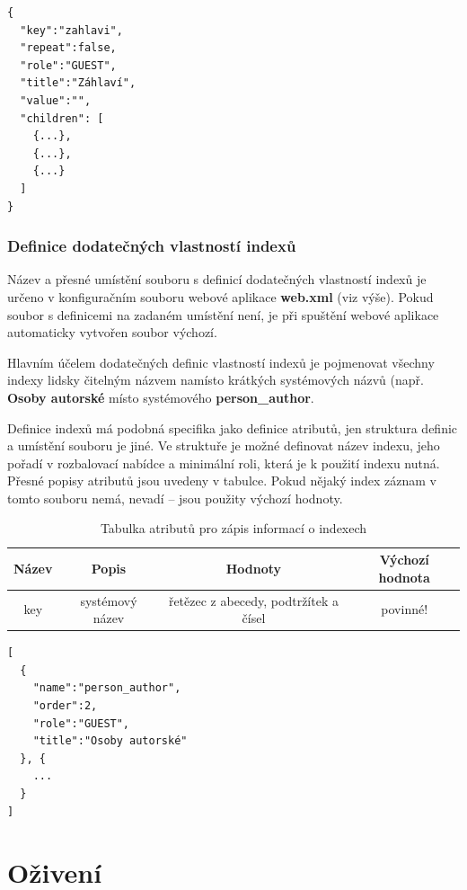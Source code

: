\begin{verbatim}
{
  "key":"zahlavi",
  "repeat":false,
  "role":"GUEST",
  "title":"Záhlaví",
  "value":"",
  "children": [
    {...},
    {...},
    {...}
  ]
}
\end{verbatim}

\subsubsection{Definice dodatečných vlastností indexů}

{\color{OliveGreen} Název a přesné umístění souboru s definicí dodatečných vlastností indexů je určeno v konfiguračním souboru webové aplikace {\bf web.xml} (viz výše). Pokud soubor s definicemi na zadaném umístění není, je při spuštění webové aplikace automaticky vytvořen soubor výchozí.}

Hlavním účelem dodatečných definic vlastností indexů je pojmenovat všechny indexy lidsky čitelným názvem namísto krátkých systémových názvů (např. {\bf Osoby autorské} místo systémového {\bf person\_author}.

Definice indexů má podobná specifika jako definice atributů, jen struktura definic a umístění souboru je jiné. Ve struktuře je možné definovat  název indexu, jeho pořadí v rozbalovací nabídce a minimální roli, která je k použití indexu nutná. Přesné popisy atributů jsou uvedeny v tabulce. Pokud nějaký index záznam v tomto souboru nemá, nevadí -- jsou použity výchozí hodnoty.

\begin{table}
\begin{center}
\begin{tabular}{|c|c|c|c|}
\hline
Název & Popis & Hodnoty & Výchozí hodnota \\
\hline
\hline
key & systémový název & řetězec z abecedy, podtržítek a čísel & povinné! \\
\hline
\end{tabular}
\end{center}
\label{tab:indexy}
\caption{Tabulka atributů pro zápis informací o indexech}
\end{table}

\begin{verbatim}
[
  {
    "name":"person_author",
    "order":2,
    "role":"GUEST",
    "title":"Osoby autorské"
  }, {
    ...
  }
]
\end{verbatim}

\section{Oživení}


